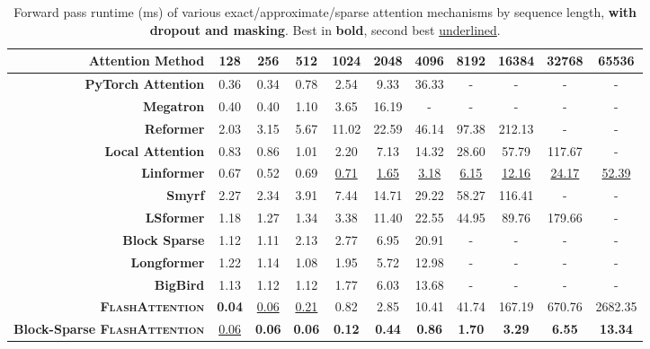 \documentclass{article}
\newcommand{\sysname}{\textsc{FlashAttention}\xspace}
\begin{document}
\begin{table}
\centering
\scriptsize
\captionsetup{font=small}
\caption{Forward pass runtime (ms) of various exact/approximate/sparse attention mechanisms by sequence length, \textbf{with dropout and masking}. Best in \textbf{bold}, second best \underline{underlined}.}
\begin{tabular}{@{}r|cccccccccc@{}}
\toprule
\textbf{Attention Method} & 128 & 256 & 512 & 1024 & 2048 & 4096 & 8192 & 16384 & 32768 & 65536 \\
\hline
\textbf{PyTorch Attention} & 0.36 & 0.34 & 0.78 & 2.54 & 9.33 & 36.33 & - & - & - & - \\
\textbf{Megatron} & 0.40 & 0.40 & 1.10 & 3.65 & 16.19 & - & - & - & - & - \\
\hline
\textbf{Reformer} & 2.03 & 3.15 & 5.67 & 11.02 & 22.59 & 46.14 & 97.38 & 212.13 & - & - \\
\textbf{Local Attention} & 0.83 & 0.86 & 1.01 & 2.20 & 7.13 & 14.32 & 28.60 & 57.79 & 117.67 & - \\
\textbf{Linformer} & 0.67 & 0.52 & 0.69 & \underline{0.71} & \underline{1.65} & \underline{3.18} & \underline{6.15} & \underline{12.16} & \underline{24.17} & \underline{52.39} \\
\textbf{Smyrf} & 2.27 & 2.34 & 3.91 & 7.44 & 14.71 & 29.22 & 58.27 & 116.41 & - & - \\
\textbf{LSformer} & 1.18 & 1.27 & 1.34 & 3.38 & 11.40 & 22.55 & 44.95 & 89.76 & 179.66 & - \\
\hline
\textbf{Block Sparse} & 1.12 & 1.11 & 2.13 & 2.77 & 6.95 & 20.91 & - & - & - & - \\
\textbf{Longformer} & 1.22 & 1.14 & 1.08 & 1.95 & 5.72 & 12.98 & - & - & - & - \\
\textbf{BigBird} & 1.13 & 1.12 & 1.12 & 1.77 & 6.03 & 13.68 & - & - & - & - \\
\hline
\textbf{\sysname} & \textbf{0.04} & \underline{0.06} & \underline{0.21} & 0.82 & 2.85 & 10.41 & 41.74 & 167.19 & 670.76 & 2682.35 \\
\textbf{Block-Sparse \sysname} & \underline{0.06} & \textbf{0.06} & \textbf{0.06} & \textbf{0.12} & \textbf{0.44} & \textbf{0.86} & \textbf{1.70} & \textbf{3.29} & \textbf{6.55} & \textbf{13.34} \\
\bottomrule
\end{tabular}
\label{tab:dropout_masking_forward_pass}
\end{table}
\end{document}
